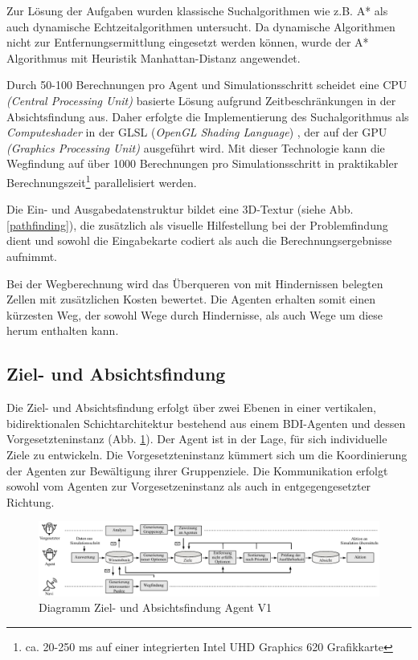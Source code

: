 \documentclass[runningheads]{llncs}
\begin{document}
	Zur Lösung der Aufgaben wurden klassische Suchalgorithmen wie z.B. A* \cite{Hart1968} als auch dynamische Echtzeitalgorithmen \cite[S. 182-191]{WeissYokoo2000} untersucht. Da dynamische Algorithmen nicht zur Entfernungsermittlung eingesetzt werden können, wurde der A* Algorithmus mit Heuristik Manhattan-Distanz \cite{Craw2017} angewendet.
	
	Durch 50-100 Berechnungen pro Agent und Simulationsschritt scheidet eine CPU \textit{(Central Processing Unit)} basierte Lösung aufgrund Zeitbeschränkungen in der Absichtsfindung aus. Daher erfolgte die Implementierung des Suchalgorithmus als \textit{Computeshader} in der GLSL (\textit{OpenGL Shading Language}) \cite{GLSL}, der auf der GPU \textit{(Graphics Processing Unit)} ausgeführt wird. Mit dieser Technologie kann die Wegfindung auf über 1000 Berechnungen pro Simulationsschritt in praktikabler Berechnungszeit\footnote{ca. 20-250 ms auf einer integrierten Intel UHD Graphics 620 Grafikkarte} parallelisiert werden.
	
	Die Ein- und Ausgabedatenstruktur bildet eine 3D-Textur (siehe Abb. \ref{pathfinding}), die zusätzlich als visuelle Hilfestellung bei der Problemfindung dient und sowohl die Eingabekarte codiert als auch die Berechnungsergebnisse aufnimmt.
	
	Bei der Wegberechnung wird das Überqueren von mit Hindernissen belegten Zellen mit zusätzlichen Kosten bewertet. Die Agenten erhalten somit einen kürzesten Weg, der sowohl Wege durch Hindernisse, als auch Wege um diese herum enthalten kann.
	
	\subsection{Ziel- und Absichtsfindung}\label{absichtsfindung}
	Die Ziel- und Absichtsfindung erfolgt über zwei Ebenen in einer vertikalen, bidirektionalen Schichtarchitektur bestehend aus einem BDI-Agenten und dessen Vorgesetzteninstanz (Abb. \ref{desires}). Der Agent ist in der Lage, für sich individuelle Ziele zu entwickeln. Die Vorgesetzteninstanz kümmert sich um die Koordinierung der Agenten zur Bewältigung ihrer Gruppenziele. Die Kommunikation erfolgt sowohl vom Agenten zur Vorgesetzeninstanz als auch in entgegengesetzter Richtung.
	
	
	\begin{figure}[h]
		\vspace{-3mm}
		\centering
		\includegraphics[scale=0.7]{./Referenzen/Entscheidungsfindung2.pdf}
		\caption{Diagramm Ziel- und Absichtsfindung Agent V1}
		\label{desires}
	\end{figure}
	\vspace{-3mm}
	
\end{document}
